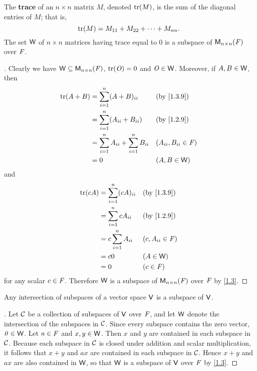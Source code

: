 \begin{eg}\label{1.3.9}
	The \textbf{trace} of an \(n \times n\) matrix \(M\), denoted \(\tr[M]\), is the sum of the diagonal entries of \(M\);
	that is,
	\[
		\tr[M] = M_{1 1} + M_{2 2} + \dots + M_{n n}.
	\]
	The set \(\mathsf{W}\) of \(n \times n\) matrices having trace equal to \(0\) is a subspace of \(\ms[n][n][\F]\) over \(\mathit{F}\).
\end{eg}

\begin{proof}[]
	Clearly we have \(\W \subseteq \ms[n][n][\F]\), \(\tr[\zm] = 0\) and \(\mathit{O} \in \mathsf{W}\).
	Moreover, if \(A, B \in \mathsf{W}\), then
	\begin{align*}
		\tr[A + B] & = \sum_{i = 1}^n (A + B)_{i i}                    &  & \by{1.3.9}                \\
		           & = \sum_{i = 1}^n (A_{i i} + B_{i i})              &  & \by{1.2.9}                \\
		           & = \sum_{i = 1}^n A_{i i} + \sum_{i = 1}^n B_{i i} &  & (A_{i i}, B_{i i} \in \F) \\
		           & = 0                                               &  & (A, B \in \W)
	\end{align*}
	and
	\begin{align*}
		\tr[cA] & = \sum_{i = 1}^n (cA)_{i i} &  & \by{1.3.9}          \\
		        & = \sum_{i = 1}^n cA_{i i}   &  & \by{1.2.9}          \\
		        & = c \sum_{i = 1}^n A_{i i}  &  & (c, A_{i i} \in \F) \\
		        & = c0                        &  & (A \in \W)          \\
		        & = 0                         &  & (c \in \F)
	\end{align*}
	for any scalar \(c \in \mathit{F}\).
	Therefore \(\mathsf{W}\) is a subspace of \(\ms[n][n][\F]\) over \(\mathit{F}\) by \cref{1.3}.
\end{proof}

\begin{thm}\label{1.4}
	Any intersection of subspaces of a vector space \(\mathsf{V}\) is a subspace of \(\mathsf{V}\).
\end{thm}

\begin{proof}[]
	Let \(\mathcal{C}\) be a collection of subspaces of \(\mathsf{V}\) over \(\mathit{F}\), and let \(\mathsf{W}\) denote the intersection of the subspaces in \(\mathcal{C}\).
	Since every subspace contains the zero vector, \(\mathit{0} \in \mathsf{W}\).
	Let \(a \in \mathit{F}\) and \(x, y \in \mathsf{W}\).
	Then \(x\) and \(y\) are contained in each subspace in \(\mathcal{C}\).
	Because each subspace in \(\mathcal{C}\) is closed under addition and scalar multiplication, it follows that \(x + y\) and \(ax\) are contained in each subspace in \(\mathcal{C}\).
	Hence \(x + y\) and \(ax\) are also contained in \(\mathsf{W}\), so that \(\mathsf{W}\) is a subspace of \(\mathsf{V}\) over \(\mathit{F}\) by \cref{1.3}.
\end{proof}

